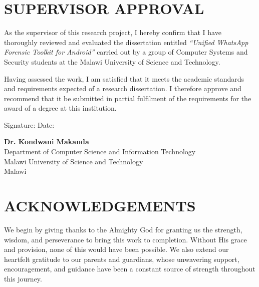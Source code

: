 \documentclass[12pt,a4paper]{report}
\begin{document}
\newpage
\chapter*{SUPERVISOR APPROVAL}

As the supervisor of this research project, I hereby confirm that I have thoroughly reviewed and evaluated the dissertation entitled \textit{``Unified WhatsApp Forensic Toolkit for Android''} carried out by a group of Computer Systems and Security students at the Malawi University of Science and Technology.

Having assessed the work, I am satisfied that it meets the academic standards and requirements expected of a research dissertation. I therefore approve and recommend that it be submitted in partial fulfilment of the requirements for the award of a degree at this institution.

\vspace{2cm}

\noindent
Signature: \underline{\hspace{5cm}} \hspace{2cm} Date: \underline{\hspace{3cm}}

\vspace{1.5cm}

\noindent
\textbf{Dr. Kondwani Makanda}\\
Department of Computer Science and Information Technology\\
Malawi University of Science and Technology\\
Malawi

\newpage
\chapter*{ACKNOWLEDGEMENTS}

We begin by giving thanks to the Almighty God for granting us the strength, wisdom, and perseverance to bring this work to completion. Without His grace and provision, none of this would have been possible. We also extend our heartfelt gratitude to our parents and guardians, whose unwavering support, encouragement, and guidance have been a constant source of strength throughout this journey.
\end{document}
